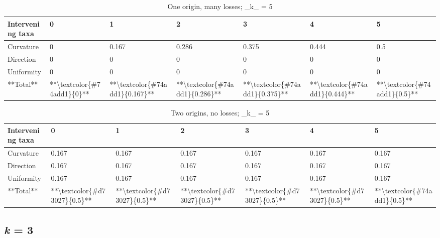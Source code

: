 \documentclass[]{book}
\theoremstyle{definition}
\theoremstyle{definition}
\theoremstyle{definition}
\theoremstyle{remark}
\begin{document}
\begin{table}

\caption{\label{tab:unnamed-chunk-76}One origin, many losses; _k_ = 5}
\centering
\begin{tabular}[t]{l|l|l|l|l|l|l}
\hline
Intervening taxa & 0 & 1 & 2 & 3 & 4 & 5\\
\hline
Curvature & 0 & 0.167 & 0.286 & 0.375 & 0.444 & 0.5\\
\hline
Direction & 0 & 0 & 0 & 0 & 0 & 0\\
\hline
Uniformity & 0 & 0 & 0 & 0 & 0 & 0\\
\hline
**Total** & **\textbackslash{}textcolor\{\#74add1\}\{0\}** & **\textbackslash{}textcolor\{\#74add1\}\{0.167\}** & **\textbackslash{}textcolor\{\#74add1\}\{0.286\}** & **\textbackslash{}textcolor\{\#74add1\}\{0.375\}** & **\textbackslash{}textcolor\{\#74add1\}\{0.444\}** & **\textbackslash{}textcolor\{\#74add1\}\{0.5\}**\\
\hline
\end{tabular}
\end{table}\begin{table}

\caption{\label{tab:unnamed-chunk-77}Two origins, no losses; _k_ = 5}
\centering
\begin{tabular}[t]{l|l|l|l|l|l|l}
\hline
Intervening taxa & 0 & 1 & 2 & 3 & 4 & 5\\
\hline
Curvature & 0.167 & 0.167 & 0.167 & 0.167 & 0.167 & 0.167\\
\hline
Direction & 0.167 & 0.167 & 0.167 & 0.167 & 0.167 & 0.167\\
\hline
Uniformity & 0.167 & 0.167 & 0.167 & 0.167 & 0.167 & 0.167\\
\hline
**Total** & **\textbackslash{}textcolor\{\#d73027\}\{0.5\}** & **\textbackslash{}textcolor\{\#d73027\}\{0.5\}** & **\textbackslash{}textcolor\{\#d73027\}\{0.5\}** & **\textbackslash{}textcolor\{\#d73027\}\{0.5\}** & **\textbackslash{}textcolor\{\#d73027\}\{0.5\}** & **\textbackslash{}textcolor\{\#74add1\}\{0.5\}**\\
\hline
\end{tabular}
\end{table}

\subsection{\texorpdfstring{\emph{k} = 3}{k = 3}}\label{k-3}
\end{document}

